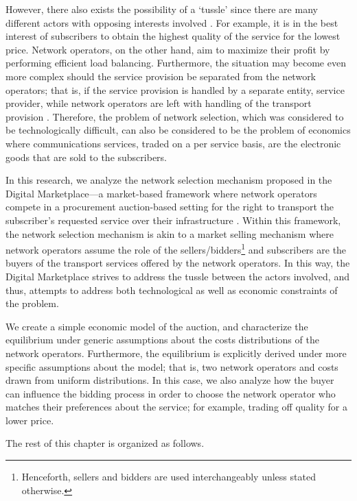However, there also exists the possibility of a `tussle' since there are many different actors with opposing interests involved \cite{Clark02}. For example, it is in the best interest of subscribers to obtain the highest quality of the service for the lowest price. Network operators, on the other hand, aim to maximize their profit by performing efficient load balancing. Furthermore, the situation may become even more complex should the service provision be separated from the network operators; that is, if the service provision is handled by a separate entity, service provider, while network operators are left with handling of the transport provision \cite{DMBushTussle09}. Therefore, the problem of network selection, which was considered to be technologically difficult, can also be considered to be the problem of economics where communications services, traded on a per service basis, are the electronic goods that are sold to the subscribers.

In this research, we analyze the network selection mechanism proposed in the Digital Marketplace---a market-based framework where network operators compete in a procurement auction-based setting for the right to transport the subscriber's requested service over their infrastructure \cite{DMLeBodic00}. Within this framework, the network selection mechanism is akin to a market selling mechanism where network operators assume the role of the sellers/bidders\footnote{Henceforth, sellers and bidders are used interchangeably unless stated otherwise.} and subscribers are the buyers of the transport services offered by the network operators. In this way, the Digital Marketplace strives to address the tussle between the actors involved, and thus, attempts to address both technological as well as economic constraints of the problem.

We create a simple economic model of the auction, and characterize the equilibrium under generic assumptions about the costs distributions of the network operators. Furthermore, the equilibrium is explicitly derived under more specific assumptions about the model; that is, two network operators and costs drawn from uniform distributions. In this case, we also analyze how the buyer can influence the bidding process in order to choose the network operator who matches their preferences about the service; for example, trading off quality for a lower price.

The rest of this chapter is organized as follows.

